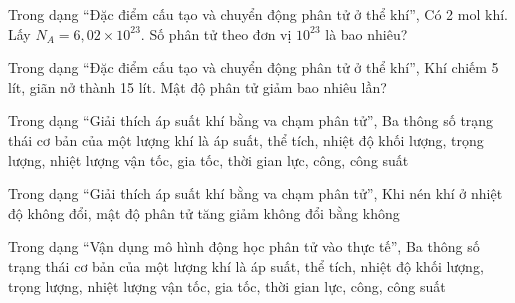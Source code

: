 \begin{ex}
Trong dạng “Đặc điểm cấu tạo và chuyển động phân tử ở thể khí”, Có 2 mol khí. Lấy $N_A=6,02\times10^{23}$. Số phân tử theo đơn vị $10^{23}$ là bao nhiêu?
\end{ex}

\begin{ex}
Trong dạng “Đặc điểm cấu tạo và chuyển động phân tử ở thể khí”, Khí chiếm 5 lít, giãn nở thành 15 lít. Mật độ phân tử giảm bao nhiêu lần?
\end{ex}

\begin{ex}
Trong dạng “Giải thích áp suất khí bằng va chạm phân tử”, Ba thông số trạng thái cơ bản của một lượng khí là
\choice
{\True áp suất, thể tích, nhiệt độ}
{khối lượng, trọng lượng, nhiệt lượng}
{vận tốc, gia tốc, thời gian}
{lực, công, công suất}
\end{ex}

\begin{ex}
Trong dạng “Giải thích áp suất khí bằng va chạm phân tử”, Khi nén khí ở nhiệt độ không đổi, mật độ phân tử
\choice
{\True tăng}
{giảm}
{không đổi}
{bằng không}
\end{ex}

\begin{ex}
Trong dạng “Vận dụng mô hình động học phân tử vào thực tế”, Ba thông số trạng thái cơ bản của một lượng khí là
\choice
{\True áp suất, thể tích, nhiệt độ}
{khối lượng, trọng lượng, nhiệt lượng}
{vận tốc, gia tốc, thời gian}
{lực, công, công suất}
\end{ex}

